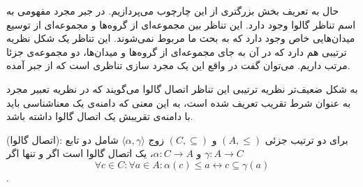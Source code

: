 حال به تعریف بخش بزرگتری از این چارچوب می‌پردازیم. در جبر مجرد مفهومی به اسم تناظر گالوا وجود دارد. این تناظر بین مجموعه‌ای از گروه‌ها و مجموعه‌ای از توسیع میدان‌هایی خاص وجود دارد که به بحث ما مربوط نمی‌شوند. این تناظر یک شکل نظریه ترتیبی هم دارد که در آن به جای مجموعه‌ای از گروه‌ها و میدان‌ها، دو مجموعه‌ی جزئا مرتب داریم. می‌توان گفت در واقع این یک مجرد سازی تناظری است که از جبر آمده. 

به شکل ضعیف‌تر نظریه ترتیبی این تناظر اتصال گالوا می‌گویند که در نظریه تعبیر مجرد به عنوان شرط تقریب تعریف شده است، به این معنی که دامنه‌ی یک معناشناسی باید با دامنه‌ی تقریبش یک اتصال گالوا داشته باشد.

\begin{defn}
	(اتصال گالوا): برای دو ترتیب جزئی
	$(A,\leq)$ 
	و
	$(C,\subseteq)$
	زوج 
	$\langle \alpha , \gamma \rangle$
	شامل دو تابع
	$\gamma:A \rightarrow C$
	و
	$\alpha:C \rightarrow A$،
	یک اتصال گالوا است اگر و تنها اگر
	$$\forall c \in C :\forall a \in A: \alpha(c)\leq a \leftrightarrow c \subseteq \gamma(a)$$.
\end{defn}









